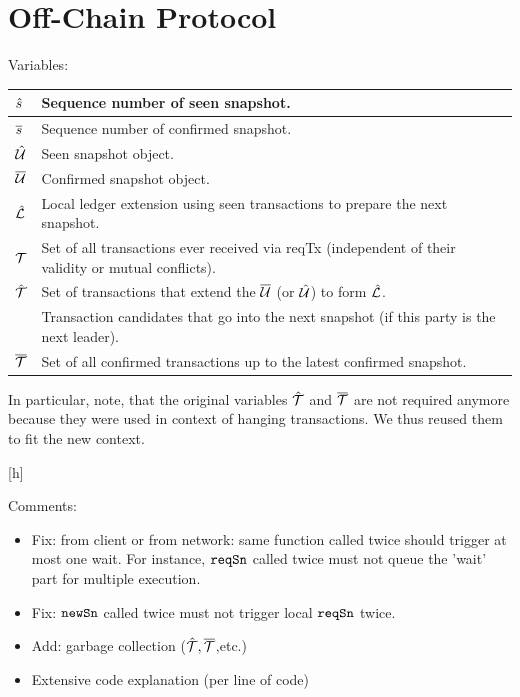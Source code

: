\section{Off-Chain Protocol}

Variables:

\begin{center}
\begin{tabular}{|l|l|}\hline
  $\hat s$  & Sequence number of seen snapshot. \\ \hline
  $\overline s$  & Sequence number of confirmed snapshot. \\ \hline
  $\hat {\mathcal U}$ & Seen snapshot object. \\ \hline
  $\overline {\mathcal U}$ & Confirmed snapshot object. \\ \hline
  $\hat {\mathcal L}$ & Local ledger extension using seen transactions to prepare the next snapshot.\\ \hline
  ${\mathcal T}$    & Set of all transactions ever received via reqTx (independent of their validity or mutual conflicts).\\  \hline
  $\hat {\mathcal T}$ & Set of transactions that extend the $\overline {\mathcal U}$ (or $\hat {\mathcal U}$) to form $\hat {\mathcal L}$. \\
           & Transaction candidates that go into the next snapshot (if this party is the next leader).\\ \hline
  $\overline {\mathcal T}$ & Set of all confirmed transactions up to the latest confirmed snapshot.\\  \hline
\end{tabular}
\end{center}

In particular, note, that the original variables $\hat {\mathcal T}$ and $\overline {\mathcal T}$ are not required anymore because they
were used in context of hanging transactions. We thus reused them to fit the new context.

[h]

Comments: 
\begin{itemize}
\item Fix: from client or from network: same function called twice should trigger at most one wait.
  For instance, $\mathtt{reqSn}$ called twice must not queue the 'wait' part for multiple execution.
\item Fix: $\mathtt{newSn}$ called twice must not trigger local $\mathtt{reqSn}$ twice.
\item Add: garbage collection ($\hat {\mathcal T},\overline {\mathcal T}$,etc.)
\item Extensive code explanation (per line of code)
\end{itemize}


